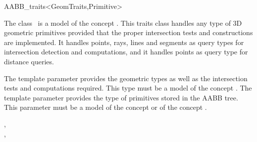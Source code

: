 \ccRefPageBegin


\begin{ccRefClass}{AABB_traits<GeomTraits,Primitive>}


\ccDefinition
  
The class \ccRefName\ is a model of the concept . This traits class handles any type of 3D geometric primitives provided that the proper intersection tests and constructions are implemented. It handles points, rays, lines and segments as query types for intersection detection and computations, and it handles points as query type for distance queries. 

\ccParameters
The template parameter  provides the geometric types as well as the intersection tests and computations required. This type must be a model of the concept . The template parameter  provides the type of primitives stored in the AABB tree. This parameter must be a model of the concept  or of the concept .


\ccTypes

\ccGlue
{}
\ccGlue
{}
\ccGlue
{}
\ccGlue
{}

{} 


\ccSeeAlso

,\\
, \\
\\
\\


\end{ccRefClass}

\ccRefPageEnd

